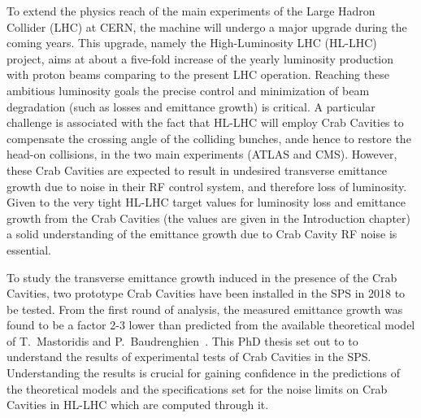 
To extend the physics reach of the main experiments of the Large Hadron Collider (LHC) at CERN, the machine will undergo a major upgrade during the coming years. This upgrade, namely the High-Luminosity LHC (HL-LHC) project, aims at about a five-fold increase of the yearly luminosity production with proton beams comparing to the present LHC operation. Reaching these ambitious luminosity goals the precise control and minimization of beam degradation (such as losses and emittance growth) is critical. A particular challenge is associated with the fact that HL-LHC will employ Crab Cavities to compensate the crossing angle of the colliding bunches, ande hence to restore the head-on collisions, in the two main experiments (ATLAS and CMS). However, these Crab Cavities are expected to result in undesired transverse emittance growth due to noise in their RF control system, and therefore loss of luminosity. %
Given to the very tight HL-LHC target values for luminosity loss and emittance growth from the Crab Cavities (the values are given in the Introduction chapter)
a solid understanding of the emittance growth due to Crab Cavity RF noise is essential. 

To study the transverse emittance growth induced in the presence of the Crab Cavities, two prototype Crab Cavities have been installed in the SPS in 2018 to be tested. From the first round of analysis, the measured
emittance growth was found to be a factor 2-3 lower than predicted from the available theoretical model of T.~Mastoridis and P.~Baudrenghien~\cite{PhysRevSTAB.18.101001}. This PhD thesis set out to to understand the results of experimental tests of Crab Cavities in the SPS. Understanding the results is crucial for gaining confidence in the predictions of the theoretical models and the specifications set for the noise limits on Crab Cavities in HL-LHC which are computed through it.

